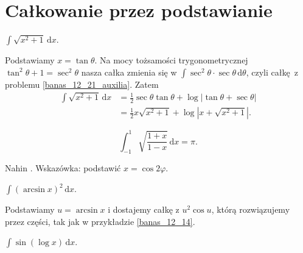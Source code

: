 \section{Całkowanie przez podstawianie}


\begin{problem}
    \label{banas_12_21}%
    $\int \sqrt{x^2 + 1} \, \mathrm{d}x$.
\end{problem}

\begin{solution}
    Podstawiamy $x = \tan \theta$.
    Na mocy tożsamości trygonometrycznej $\tan^2 \theta + 1 = \sec^2 \theta$ nasza całka zmienia się w $\int \sec^2 \theta \cdot \sec \theta \,\mathrm{d}\theta$, czyli całkę z problemu \ref{banas_12_21_auxilia}.
    Zatem
    \begin{align}
        \int \sqrt{x^2 + 1} \, \mathrm{d}x & = \frac 12 \sec \theta \tan \theta + \log |\tan \theta + \sec \theta| \\
        & = \frac 1 2 x \sqrt{x^2 + 1} + \log \left|x + \sqrt{x^2+1}\right|.
    \end{align}
\end{solution}

\begin{problem}
    \begin{equation}
        \int_{-1}^1 \sqrt{\frac{1+x}{1-x}} \,\mathrm{d}x = \pi.
    \end{equation}
\end{problem}

\begin{solution}
    Nahin \cite[s. 115, 378]{nahin15}.
    Wskazówka: podstawić $x = \cos 2 \varphi$.
\end{solution}


\begin{problem}
    \label{banas_12_18}%
    $\int (\arcsin x)^2 \,\mathrm{d}x$.
\end{problem}

\begin{solution}
    Podstawiamy $u = \arcsin x$ i dostajemy całkę z $u^2 \cos u$, którą rozwiązujemy przez części, tak jak w przykładzie \ref{banas_12_14}.
\end{solution}

\begin{problem}
    \label{banas_12_19}%
    $\int \sin(\log x) \, \mathrm{d}x$.
\end{problem}


